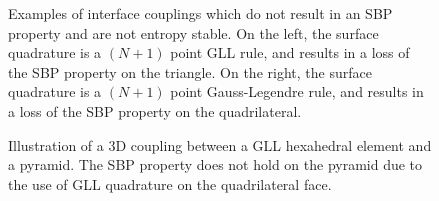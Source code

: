 \documentclass[review]{siamart0216}
\theoremstyle{assumption}
\begin{document}
\begin{figure}
\centering
\begingroup
\captionsetup[subfigure]{width=.425\textwidth}
\endgroup
\hspace{2em}
\caption{Examples of interface couplings which do not result in an SBP property and are not entropy stable.  On the left, the surface quadrature is a $(N+1)$ point GLL rule, and results in a loss of the SBP property on the triangle.  On the right, the surface quadrature is a $(N+1)$ point Gauss-Legendre rule, and results in a loss of the SBP property on the quadrilateral.  }
\label{fig:hybrid}
\end{figure}

\begin{figure}
\centering
{}
\hspace{2em}
\caption{Illustration of a 3D coupling between a GLL hexahedral element and a pyramid.  The SBP property does not hold on the pyramid due to the use of GLL quadrature on the quadrilateral face. }
\label{fig:hybrid3d}
\end{figure}
\end{document}
